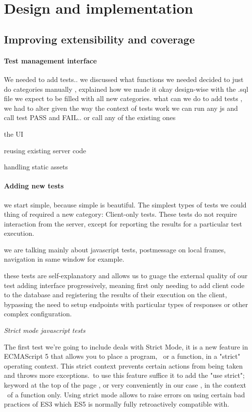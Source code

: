 
\chapter{Design and implementation}

\section{Improving extensibility and coverage}
\label{label:addtest}

\subsubsection{Test management interface}

We needed to add tests..
we discussed what functions we needed
decided to just do categories manually , explained how we made it okay design-wise with the .sql file we expect to be filled with all new categories.
what can we do to add tests , we had to alter
given the way the context of tests work we can run any js and call test PASS and FAIL.. or call any of the existing ones

the UI

reusing existing server code

handling static assets

\subsubsection{Adding new tests}

we start simple, because simple is beautiful. The simplest types of tests we could thing of required a new category: Client-only tests.
These tests do not require interaction from the server, except for reporting the results for a particular test execution.

we are talking mainly about javascript tests, postmessage on local frames, navigation in same window for example.

these tests are self-explanatory and allows us to guage the external quality of our test adding interface progressively, meaning first only needing
to add client code to the database and registering the results of their execution on the client, bypassing the need to setup endpoints with particular types
of responses or other complex configuration. 

\emph{Strict mode javascript tests}

The first test we're going to include deals with Strict Mode, it is a new feature in ECMAScript 5 that allows you to place a program, \
or a function, in a "strict" operating context. This strict context prevents certain actions from being taken and throws more exceptions.\
to use this feature suffice it to add the  "use strict"; keyword at the top of the page , or very conveniently in our case , in the context \
of a function only. Using strict mode allows to raise errors on using certain bad practices of ES3 which ES5 is normally fully retroactively compatible with.\

